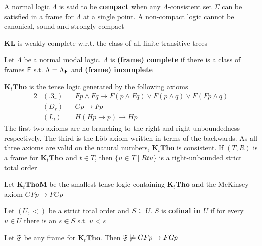 \documentclass[11pt]{article}
\newcommand{\KL}{\textbf{KL}}
\newcommand{\KtTho}{\textbf{K}_t\textbf{Tho}}
\newcommand{\KtThoM}{\textbf{K}_t\textbf{ThoM}}
\begin{document}
\begin{remark}
\label{remark4.44}
A normal logic \(\Lambda\) is said to be \textbf{compact} when any \(\Lambda\)-consistent set \(\Sigma\)
can be satisfied in a frame for \(\Lambda\) at a single point. A non-compact logic
cannot be canonical, sound and strongly compact
\end{remark}

\begin{theorem}[]
\(\KL\) is weakly complete w.r.t. the class of all finite transitive trees
\end{theorem}

\begin{definition}[]
Let \(\Lambda\) be a normal modal logic. \(\Lambda\) is \textbf{(frame) complete} if there is a class of
frames \(\textsf{F}\) s.t. \(\Lambda=\Lambda_{\textsf{F}}\) and \textbf{(frame) incomplete}
\end{definition}

\(\KtTho\) is the tense logic generated by the following axioms
\begin{alignat*}{2}
&(.3_r)&&Fp\wedge Fq\to F(p\wedge Fq)\vee F(p\wedge q)\vee F(Fp\wedge q)\\
&(D_r)&&Gp\to Fp\\
&(L_l)&&H(Hp\to p)\to Hp
\end{alignat*}
The first two axioms are no branching to the right and right-unboundedness
respectively. The third is the Löb axiom written in terms of the backwards.
As all three axioms are valid on the natural numbers, \(\KtTho\) is
consistent. If \((T,R)\) is a frame for \(\KtTho\) and \(t\in T\), then
\(\{u\in T\mid Rtu\}\) is a right-unbounded strict total order

Let \(\KtThoM\) be the smallest tense logic containing \(\KtTho\) and the
McKinsey axiom \(GFp\to FGp\)

\begin{definition}[]
Let \((U,<)\) be a strict total order and \(S\subseteq U\). \(S\) is \textbf{cofinal
in} \(U\) if for every \(u\in U\) there is an \(s\in S\) s.t. \(u<s\)
\end{definition}

\begin{lemma}[]
Let \(\mathfrak{F}\) be any frame for \(\KtTho\). Then \(\mathfrak{F}\not\models GFp\to FGp\)
\end{lemma}
\end{document}
